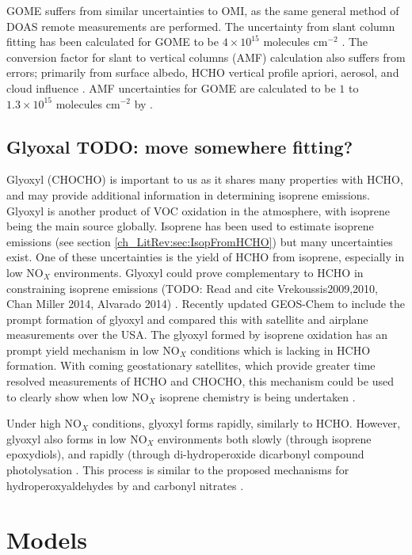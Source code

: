       GOME suffers from similar uncertainties to OMI, as the same general method of DOAS remote measurements are performed.
      The uncertainty from slant column fitting has been calculated for GOME to be $4\times10^{15}$ molecules cm$^{-2}$ \citep{Chance2000, Millet2006}. 
      The conversion factor for slant to vertical columns (AMF) calculation also suffers from errors; primarily from surface albedo, HCHO vertical profile apriori, aerosol, and cloud influence \citep{Millet2006}. 
      AMF uncertainties for GOME are calculated to be $1$ to $1.3\times10^{15}$ molecules cm$^{-2}$ by \citet{Shim2005}.
    
  \subsection{Glyoxal TODO: move somewhere fitting?}
    Glyoxyl (CHOCHO) is important to us as it shares many properties with HCHO, and may provide additional information in determining isoprene emissions.
    Glyoxyl is another product of VOC oxidation in the atmosphere, with isoprene being the main source globally.
    Isoprene has been used to estimate isoprene emissions (see section \ref{ch_LitRev:sec:IsopFromHCHO}) but many uncertainties exist.
    One of these uncertainties is the yield of HCHO from isoprene, especially in low NO$_X$ environments.
    Glyoxyl could prove complementary to HCHO in constraining isoprene emissions (TODO: Read and cite Vrekoussis2009,2010, Chan Miller 2014, Alvarado 2014) \citep{Miller2017}.
    Recently \cite{Miller2017} updated GEOS-Chem to include the prompt formation of glyoxyl and compared this with satellite and airplane measurements over the USA.
    The glyoxyl formed by isoprene oxidation has an prompt yield mechanism in low NO$_X$ conditions which is lacking in HCHO formation.
    With coming geostationary satellites, which provide greater time resolved measurements of HCHO and CHOCHO, this mechanism could be used to clearly show when low NO$_X$ isoprene chemistry is being undertaken \citep{Miller2017}.
    
    Under high NO$_X$ conditions, glyoxyl forms rapidly, similarly to HCHO.
    However, glyoxyl also forms in low NO$_X$ environments both slowly (through isoprene epoxydiols), and rapidly (through di-hydroperoxide dicarbonyl compound photolysation \citep{Crounse2013}.
    This process is similar to the proposed mechanisms for hydroperoxyaldehydes by \citet{Peeters2014} and carbonyl nitrates \citep{Muller2014}.
    
\section{Models}
  \label{LR:Models}
